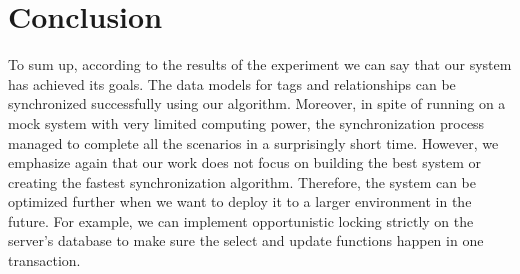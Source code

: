 
\section{Conclusion}
To sum up, according to the results of the experiment we can say that our system has achieved its goals. The data models for tags and relationships can be synchronized successfully using our algorithm. Moreover, in spite of running on a mock system with very limited computing power, the synchronization process managed to complete all the scenarios in a surprisingly short time. However, we emphasize again that our work does not focus on building the best system or creating the fastest synchronization algorithm. Therefore, the system can be optimized further when we want to deploy it to a larger environment in the future. For example, we can implement opportunistic locking strictly on the server's database to make sure the select and update functions happen in one transaction.

